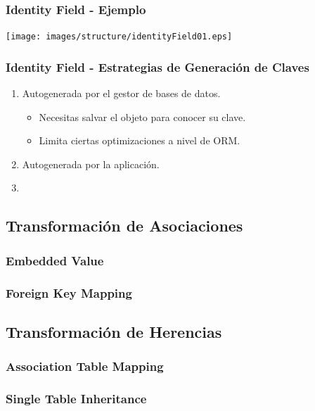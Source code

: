 \documentclass[a4paper,slidestop,xcolor=pst,blue]{beamer}
\begin{document}
\begin{frame}[c]
    \frametitle{Identity Field - Ejemplo}
    \begin{center}
        \texttt{[image: images/structure/identityField01.eps]}
    \end{center}
\end{frame}

\begin{frame}[c]
    \frametitle{Identity Field - Estrategias de Generación de Claves}
    \begin{enumerate}
        \item<1-> Autogenerada por el gestor de bases de datos.
            \begin{itemize}
                \item<2-> Necesitas salvar el objeto para conocer su clave.
                \item<3-> Limita ciertas optimizaciones a nivel de ORM.
            \end{itemize}
        \item<2-> Autogenerada por la aplicación.
        \item<3->
    \end{enumerate}
\end{frame}

\subsection{Transformación de Asociaciones}

\subsubsection{Embedded Value}

\subsubsection{Foreign Key Mapping}

\subsection{Transformación de Herencias}

\subsubsection{Association Table Mapping}

\subsubsection{Single Table Inheritance}
\end{document}
